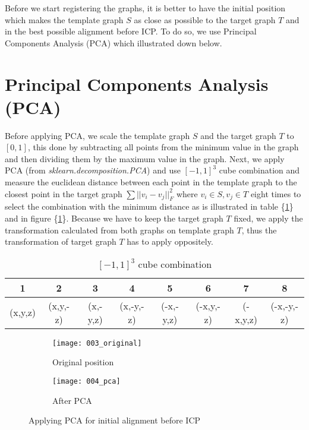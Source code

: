 \documentclass[../structure.tex]{subfiles}
\begin{document}
\hspace{2em}Before we start registering the graphs, it is better to have the initial position which makes the template graph $S$ as close as possible to the target graph $T$ and in the best possible alignment before ICP. To do so, we use Principal Components Analysis (PCA) which illustrated down below.

\section{Principal Components Analysis (PCA)}
\hspace{2em}Before applying PCA, we scale the template graph $S$ and the target graph $T$ to $[0,1]$, this done by subtracting all points from the minimum value in the graph and then dividing them by the maximum value in the graph. Next, we apply PCA (from \textit{sklearn.decomposition.PCA}) and use $[-1,1]^3$ cube combination and measure the euclidean distance between each point in the template graph to the closest point in the target graph $\sum ||v_i-v_j||_F^2$ where $v_i \in S, v_j \in T$ eight times to select the combination with the minimum distance as is illustrated in table \{\ref{table:cube}\} and in figure \{\ref{fig:pca}\}. Because we have to keep the target graph $T$ fixed, we apply the transformation calculated from both graphs on template graph $T$, thus the transformation of target graph $T$ has to apply oppositely.
\vspace{2em}
\begin{center}
\begin{table}[h]
	\begin{tabular}{| c | c | c | c | c | c | c | c |}
	\hline
	1 & 2 & 3 & 4 & 5 & 6 & 7 & 8\\
	\hline
	(x,y,z) & (x,y,-z) & (x,-y,z) & (x,-y,-z) & (-x,-y,z) & (-x,y,-z) & (-x,y,z) & (-x,-y,-z)\\
	\hline
	\end{tabular}
\caption{$[-1,1]^3$ cube combination}
\label{table:cube}
\end{table}
\end{center}

\begin{figure}[h!]
	\centering
	\begin{subfigure}[b]{0.59\textwidth}
	\texttt{[image: 003\_original]}
	\caption{Original position}
	\end{subfigure}
	\begin{subfigure}[b]{0.40\textwidth}
	\texttt{[image: 004\_pca]}
	\caption{After PCA}
	\end{subfigure}
\caption{Applying PCA for initial alignment before ICP}
\label{fig:pca}
\end{figure}
\end{document}
